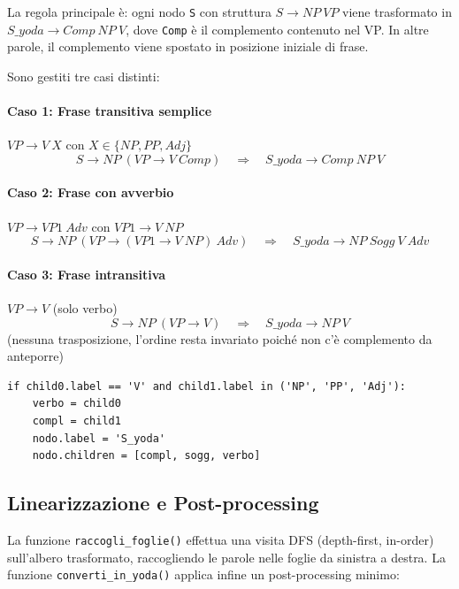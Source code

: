 \documentclass[12pt, a4paper]{article}
\begin{document}
La regola principale è: ogni nodo \texttt{S} con struttura $S \rightarrow NP\ VP$
viene trasformato in $S\_yoda \rightarrow Comp\ NP\ V$, dove \texttt{Comp} è il
complemento contenuto nel VP. In altre parole, il complemento viene spostato in
posizione iniziale di frase.

Sono gestiti tre casi distinti:

\paragraph{Caso 1: Frase transitiva semplice} $VP \rightarrow V\ X$ con $X \in \{NP, PP, Adj\}$
\[
    S \rightarrow NP\ (VP \rightarrow V\ Comp)
    \quad \Longrightarrow \quad
    S\_yoda \rightarrow Comp\ NP\ V
\]

\paragraph{Caso 2: Frase con avverbio} $VP \rightarrow VP1\ Adv$ con $VP1 \rightarrow V\ NP$
\[
    S \rightarrow NP\ (VP \rightarrow (VP1 \rightarrow V\ NP)\ Adv)
    \quad \Longrightarrow \quad
    S\_yoda \rightarrow NP\ Sogg\ V\ Adv
\]

\paragraph{Caso 3: Frase intransitiva} $VP \rightarrow V$ (solo verbo)
\[
    S \rightarrow NP\ (VP \rightarrow V)
    \quad \Longrightarrow \quad
    S\_yoda \rightarrow NP\ V
\]
(nessuna trasposizione, l'ordine resta invariato poiché non c'è complemento da anteporre)

\begin{lstlisting}[caption={Trasformazione Caso 1 -- VP con complemento diretto}]
if child0.label == 'V' and child1.label in ('NP', 'PP', 'Adj'):
    verbo = child0
    compl = child1
    nodo.label = 'S_yoda'
    nodo.children = [compl, sogg, verbo]
\end{lstlisting}

\subsection{Linearizzazione e Post-processing}

La funzione \texttt{raccogli\_foglie()} effettua una visita DFS (depth-first,
in-order) sull'albero trasformato, raccogliendo le parole nelle foglie da sinistra
a destra. La funzione \texttt{converti\_in\_yoda()} applica infine un post-processing
minimo:
\end{document}
